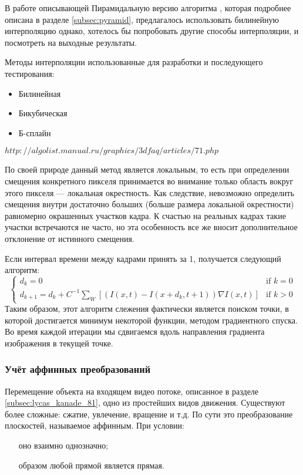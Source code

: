 В работе описывающей Пирамидальную версию алгоритма \cite{Bouguet2000}, которая подробнее описана в разделе \ref{subsec:pyramid}, предлагалось использовать билинейную интерполяцию однако, хотелось бы попробовать другие способы интерполяции, и посмотреть на выходные результаты.

Методы интерполяции использованные для разработки и последующего тестирования:
\begin{itemize}
\item Билинейная
\item Бикубическая
\item Б-сплайн
\end{itemize}
 $http://algolist.manual.ru/graphics/3dfaq/articles/71.php$

По своей природе данный метод является локальным, то есть при определении смещения конкретного пикселя принимается во внимание только область вокруг этого пикселя — локальная окрестность. Как следствие, невозможно определить смещения внутри достаточно больших (больше размера локальной окрестности) равномерно окрашенных участков кадра. К счастью на реальных кадрах такие участки встречаются не часто, но эта особенность все же вносит дополнительное отклонение от истинного смещения.

Если интервал времени между кадрами принять за 1, получается следующий алгоритм:
$$\begin{cases} d_k = 0 &\mbox{if } k = 0 \\
d_{k+1}=d_k + C^{-1} \sum_W \left[ (I(x,t) - I(x+d_k,t + 1)) \nabla I (x,t) \right] & \mbox{if } k > 0 \end{cases}
$$
Таким образом, этот алгоритм слежения фактически является поиском точки, в которой достигается минимум некоторой функции, методом градиентного спуска. Во время каждой итерации мы сдвигаемся вдоль направления градиента изображения в текущей точке.
\subsubsection{Учёт аффинных преобразований}
Перемещение объекта на входящем видео потоке, описанное в разделе \ref{subsec:lycas_kanade_81}, одно из простейших видов движения. Существуют более сложные: сжатие, увлечение, вращение и т.д. По сути это преобразование плоскостей, называемое аффинным. При условии:
\begin{itemize}
\item[оно взаимно однозначно;]
\item[образом любой прямой является прямая.]
\end{itemize}

